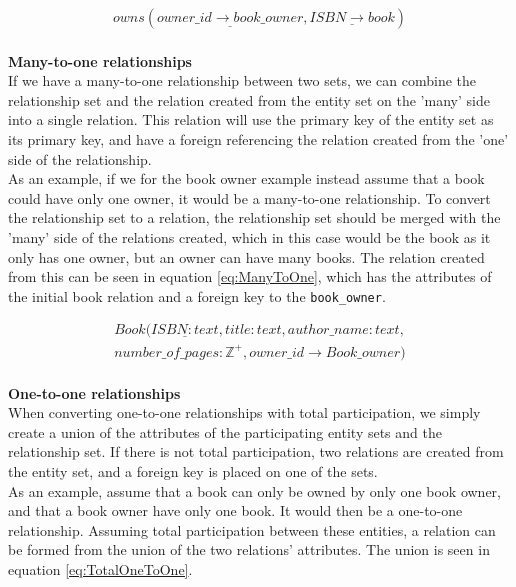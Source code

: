 \begin{equation}\label{eq:ManyToMany}
    \begin{split}
        owns(\underline{owner\_id \rightarrow book\_owner}, \underline{ISBN \rightarrow book})
    \end{split}
\end{equation}
\\
\textbf{Many-to-one relationships}\\
If we have a many-to-one relationship between two sets, we can combine the relationship set and the relation created from the entity set on the 'many' side into a single relation. This relation will use the primary key of the entity set as its primary key, and have a foreign referencing the relation created from the 'one' side of the relationship.\\
As an example, if we for the book owner example instead assume that a book could have only one owner, it would be a many-to-one relationship. To convert the relationship set to a relation, the relationship set should be merged with the 'many' side of the relations created, which in this case would be the book as it only has one owner, but an owner can have many books. The relation created from this can be seen in equation \ref*{eq:ManyToOne}, which has the attributes of the initial book relation and a foreign key to the \texttt{book\_owner}.

\begin{equation}\label{eq:ManyToOne}
    \begin{split}
        Book(\underline{ISBN : text} , title : text , author\_name : text , \\number\_of\_pages : \mathbb{Z}^+, owner\_id \rightarrow Book\_owner)
    \end{split}
\end{equation}
\\
\textbf{One-to-one relationships}\\
When converting one-to-one relationships with total participation, we simply create a union of the attributes of the participating entity sets and the relationship set\cite{DBSBook}. If there is not total participation, two relations are created from the entity set, and a foreign key is placed on one of the sets.\\
As an example, assume that a book can only be owned by only one book owner, and that a book owner have only one book. It would then be a one-to-one relationship. Assuming total participation between these entities, a relation can be formed from the union of the two relations' attributes. The union is seen in equation \ref*{eq:TotalOneToOne}.

